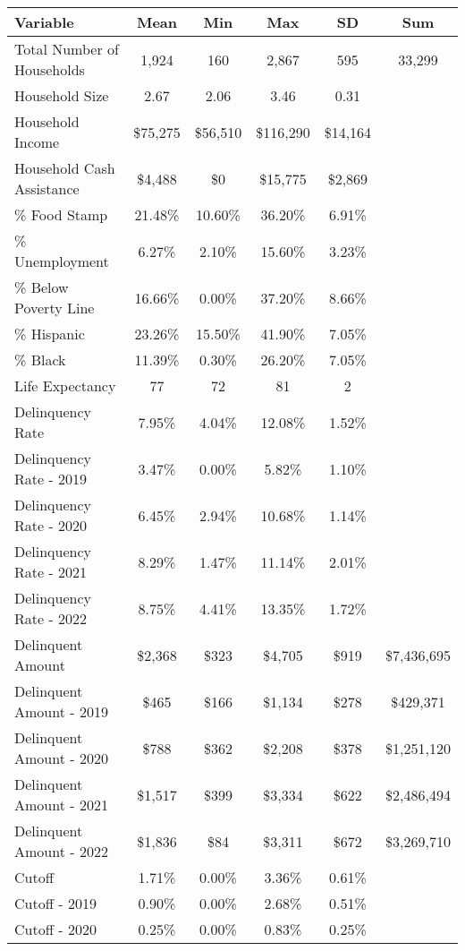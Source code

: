 \begin{tabular}{l|c|c|c|c|c}
\toprule 
\midrule 
Variable & Mean & Min & Max & SD & Sum \\
\midrule 
Total Number of Households & 1,924 & 160 & 2,867 & 595 & 33,299 \\
\quad Household Size & 2.67 & 2.06 & 3.46 & 0.31 \\
Household Income & \$75,275 & \$56,510 & \$116,290 & \$14,164 \\
\quad Household Cash Assistance & \$4,488 & \$0 & \$15,775 & \$2,869 \\
\% Food Stamp & 21.48\% & 10.60\% & 36.20\% & 6.91\% \\
\% Unemployment & 6.27\% & 2.10\% & 15.60\% & 3.23\% \\
\% Below Poverty Line & 16.66\% & 0.00\% & 37.20\% & 8.66\% \\
\% Hispanic & 23.26\% & 15.50\% & 41.90\% & 7.05\% \\
\% Black & 11.39\% & 0.30\% & 26.20\% & 7.05\% \\
Life Expectancy & 77 & 72 & 81 & 2 \\
\midrule 
Delinquency Rate & 7.95\% & 4.04\% & 12.08\% & 1.52\% \\
\quad Delinquency Rate - 2019 & 3.47\% & 0.00\% & 5.82\% & 1.10\% \\
\quad Delinquency Rate - 2020 & 6.45\% & 2.94\% & 10.68\% & 1.14\% \\
\quad Delinquency Rate - 2021 & 8.29\% & 1.47\% & 11.14\% & 2.01\% \\
\quad Delinquency Rate - 2022 & 8.75\% & 4.41\% & 13.35\% & 1.72\% \\
\midrule 
Delinquent Amount & \$2,368 & \$323 & \$4,705 & \$919 & \$7,436,695 \\
\quad Delinquent Amount - 2019 & \$465 & \$166 & \$1,134 & \$278 & \$429,371 \\
\quad Delinquent Amount - 2020 & \$788 & \$362 & \$2,208 & \$378 & \$1,251,120 \\
\quad Delinquent Amount - 2021 & \$1,517 & \$399 & \$3,334 & \$622 & \$2,486,494 \\
\quad Delinquent Amount - 2022 & \$1,836 & \$84 & \$3,311 & \$672 & \$3,269,710 \\
\midrule 
Cutoff & 1.71\% & 0.00\% & 3.36\% & 0.61\% \\
\quad Cutoff - 2019 & 0.90\% & 0.00\% & 2.68\% & 0.51\% \\
\quad Cutoff - 2020 & 0.25\% & 0.00\% & 0.83\% & 0.25\% \\

\end{tabular}
